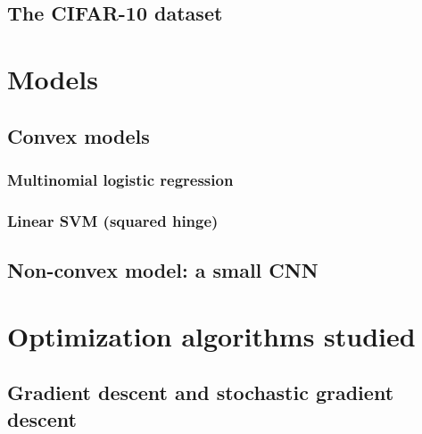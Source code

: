 \documentclass[11pt,a4paper]{article}
\begin{document}
\subsection{The CIFAR-10 dataset}

\section{Models}

\subsection{Convex models}
\subsubsection{Multinomial logistic regression}

\subsubsection{Linear SVM (squared hinge)}

\subsection{Non-convex model: a small CNN}

\section{Optimization algorithms studied}

\subsection{Gradient descent and stochastic gradient descent}
\end{document}
